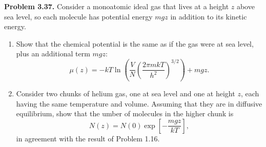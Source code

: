 \documentclass[a4paper, 12pt]{config/homework}
\begin{document}
\pagebreak
\noindent
\textbf{Problem 3.37.} Consider a monoatomic ideal gas that lives at a height \(z\) above sea level, so each molecule has potential energy \(mgz\) in addition to its kinetic energy.
\begin{enumerate}[label=\textbf{(\alph*)}]
\item Show that the chemical potential is the same as if the gas were at sea level, plus an additional term \(mgz\):
\[\mu(z) = - kT\ln\left(\frac{V}{N}\left(\frac{2\pi m k T}{h^2}\right)^{3/2}\right) + mgz.\]
\item Consider two chunks of helium gas, one at sea level and one at height \(z\), each having the same temperature and volume. Assuming that they are in diffusive equilibrium, show that the umber of molecules in the higher chunk is
\[N(z) = N(0)\exp\left[-\frac{mgz}{kT}\right],\]
in agreement with the result of Problem 1.16.
\end{enumerate}
\bigskip
\end{document}
